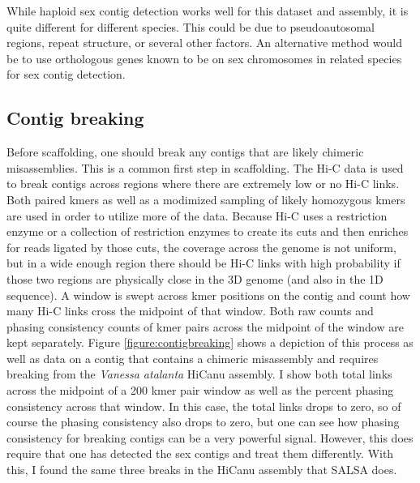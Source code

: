 {\par{
While haploid sex contig detection works well for this dataset and assembly, it is quite different for different species. This could be due to pseudoautosomal regions, repeat structure, or several other factors. An alternative method would be to use orthologous genes known to be on sex chromosomes in related species for sex contig detection. 
}

\subsection{Contig breaking}

\par{
Before scaffolding, one should break any contigs that are likely chimeric misassemblies. This is a common first step in scaffolding\cite{SALSA}\cite{scaffoldingreview}. The Hi-C data is used to break contigs across regions where there are extremely low or no Hi-C links. Both paired kmers as well as a modimized sampling of likely homozygous kmers are used in order to utilize more of the data. Because Hi-C uses a restriction enzyme or a collection of restriction enzymes to create its cuts and then enriches for reads ligated by those cuts, the coverage across the genome is not uniform, but in a wide enough region there should be Hi-C links with high probability if those two regions are physically close in the 3D genome (and also in the 1D sequence). A window is swept across kmer positions on the contig and count how many Hi-C links cross the midpoint of that window. Both raw counts and phasing consistency counts of kmer pairs across the midpoint of the window are kept separately. Figure \ref{figure:contigbreaking} shows a depiction of this process as well as data on a contig that contains a chimeric misassembly and requires breaking from the \textit{Vanessa atalanta} HiCanu assembly. I show both total links across the midpoint of a 200 kmer pair window as well as the percent phasing consistency across that window. In this case, the total links drops to zero, so of course the phasing consistency also drops to zero, but one can see how phasing consistency for breaking contigs can be a very powerful signal. However, this does require that one has detected the sex contigs and treat them differently. With this, I found the same three breaks in the HiCanu assembly that SALSA does.
}

}

